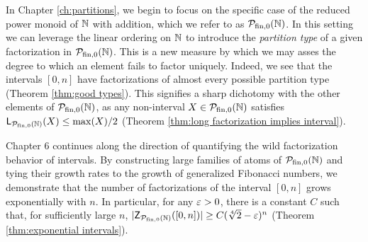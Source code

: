 In Chapter \ref{ch:partitions}, we begin to focus on the specific case of the reduced power monoid of $\mathbb{N}$ with addition, which we refer to as ${\mathcal{P}_{\textrm{fin},0}(\mathbb{N})}$. 
In this setting we can leverage the linear ordering on $\mathbb{N}$ to introduce the \textit{partition type} of a given factorization in ${\mathcal{P}_{\textrm{fin},0}(\mathbb{N})}$.
This is a new measure by which we may asses the degree to which an element fails to factor uniquely.
Indeed, we see that the intervals $[0,n]$ have factorizations of almost every possible partition type (Theorem \ref{thm:good types}).
This signifies a sharp dichotomy with the other elements of ${\mathcal{P}_{\textrm{fin},0}(\mathbb{N})}$, as any non-interval $X\in {\mathcal{P}_{\textrm{fin},0}(\mathbb{N})}$ satisfies $\mathsf{L}_{\mathcal{P}_{\textrm{fin},0}(\mathbb{N})}(X) \le \max(X)/2$ (Theorem \ref{thm:long factorization implies interval}).


Chapter 6 continues along the direction of quantifying the wild factorization behavior of intervals.
By constructing large families of atoms of ${\mathcal{P}_{\textrm{fin},0}(\mathbb{N})}$ and tying their growth rates to the growth of generalized Fibonacci numbers, we demonstrate that the number of factorizations of the interval $[0,n]$ grows exponentially with $n$.
In particular, for any $\varepsilon>0$, there is a constant $C$ such that, for sufficiently large $n$, $|\mathsf{Z}_{\mathcal{P}_{\textrm{fin},0}(\mathbb{N})}([0,n])| \ge C(\sqrt[4]{2}-\varepsilon)^n$ (Theorem \ref{thm:exponential intervals}).


